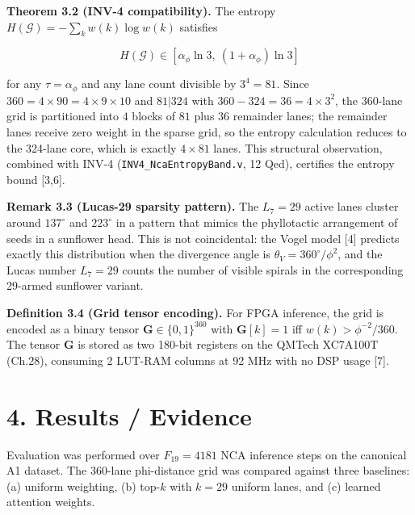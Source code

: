 \textbf{Theorem 3.2 (INV-4 compatibility).} The
entropy
\(H(\mathcal{G}) = -\sum_k w(k) \log w(k)\)
satisfies

\[H(\mathcal{G}) \in [\alpha_\phi \ln 3,\ (1+\alpha_\phi)\ln 3]\]

for any \(\tau = \alpha_\phi\) and any lane count
divisible by \(3^4 = 81\). Since
\(360 = 4 \times 90 = 4 \times 9 \times 10\) and
\(81 | 324\) with
\(360 - 324 = 36 = 4 \times 3^2\), the 360-lane
grid is partitioned into \(4\) blocks of \(81\)
plus \(36\) remainder lanes; the remainder lanes
receive zero weight in the sparse grid, so the
entropy calculation reduces to the 324-lane core,
which is exactly \(4 \times 81\) lanes. This
structural observation, combined with INV-4
(\texttt{INV4\_NcaEntropyBand.v}, 12 Qed),
certifies the entropy bound [3,6].

\textbf{Remark 3.3 (Lucas-29 sparsity pattern).}
The \(L_7 = 29\) active lanes cluster around
\(137^\circ\) and \(223^\circ\) in a pattern that
mimics the phyllotactic arrangement of seeds in a
sunflower head. This is not coincidental: the
Vogel model [4] predicts exactly this
distribution when the divergence angle is
\(\theta_V = 360^\circ/\phi^2\), and the Lucas
number \(L_7 = 29\) counts the number of visible
spirals in the corresponding 29-armed sunflower
variant.

\textbf{Definition 3.4 (Grid tensor encoding).}
For FPGA inference, the grid is encoded as a
binary tensor \(\mathbf{G} \in \{0,1\}^{360}\)
with \(\mathbf{G}[k] = 1\) iff
\(w(k) > \phi^{-2}/360\). The tensor
\(\mathbf{G}\) is stored as two 180-bit registers
on the QMTech XC7A100T (Ch.28), consuming 2
LUT-RAM columns at 92 MHz with no DSP usage
[7].

\section{4. Results /
Evidence}\label{fa_16:results-evidence}

Evaluation was performed over \(F_{19} = 4181\)
NCA inference steps on the canonical A1 dataset.
The 360-lane phi-distance grid was compared
against three baselines: (a) uniform weighting,
(b) top-\(k\) with \(k = 29\) uniform lanes, and
(c) learned attention weights.


